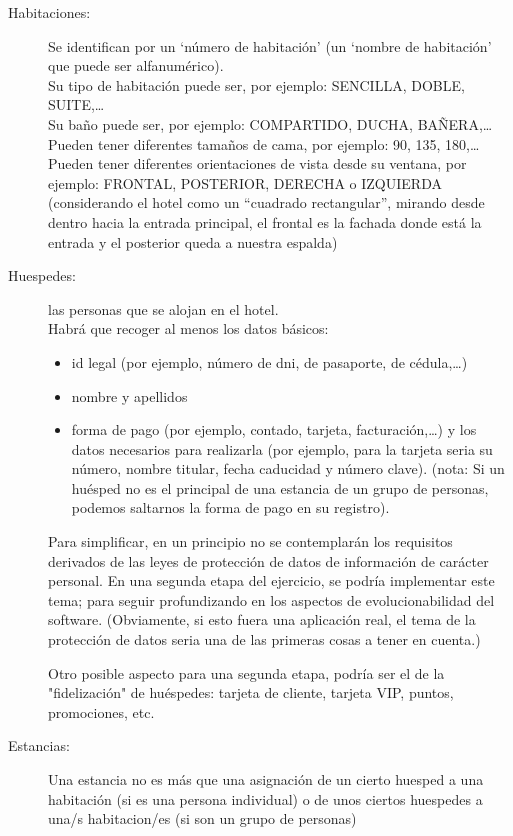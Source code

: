\documentclass[spanish,12pt,a4paper,final,oneside]{book}
\begin{document}
\begin{description}


\item[Habitaciones:] Se identifican por un `número de habitación' (un `nombre de habitación' que puede ser alfanumérico).
\\Su tipo de habitación puede ser, por ejemplo: SENCILLA, DOBLE, SUITE,\ldots
\\Su baño puede ser, por ejemplo:  COMPARTIDO, DUCHA, BAÑERA,\ldots
\\Pueden tener diferentes tamaños de cama, por ejemplo: 90, 135, 180,\ldots
\\Pueden tener diferentes orientaciones de vista desde su ventana, por ejemplo: FRONTAL, POSTERIOR, DERECHA o IZQUIERDA (considerando el hotel como un ``cuadrado rectangular'', mirando desde dentro hacia la entrada principal, el frontal es la fachada donde está la entrada y el posterior queda a nuestra espalda)

\item[Huespedes:] las personas que se alojan en el hotel.
\\Habrá que recoger al menos los datos básicos:
\begin{itemize}
\item id legal (por ejemplo, número de dni, de pasaporte, de cédula,\ldots)
\item nombre y apellidos
\item forma de pago (por ejemplo, contado, tarjeta, facturación,\ldots) y los datos necesarios para realizarla (por ejemplo, para la tarjeta seria su número, nombre titular, fecha caducidad y número clave).  (nota: Si un huésped no es el principal de una estancia de un grupo de personas, podemos saltarnos la forma de pago en su registro).
\end{itemize}

Para simplificar, en un principio no se contemplarán los requisitos derivados de las leyes de protección de datos de información de carácter personal.  En una segunda etapa del ejercicio, se podría implementar este tema; para seguir profundizando en los aspectos de evolucionabilidad del software.
(Obviamente, si esto fuera una aplicación real, el tema de la protección de datos seria una de las primeras cosas a tener en cuenta.)

Otro posible aspecto para una segunda etapa, podría ser el de la "fidelización" de huéspedes: tarjeta de cliente, tarjeta VIP, puntos, promociones, etc.

\item[Estancias:] Una estancia no es más que una asignación de un cierto huesped a una habitación (si es una persona individual) o de 
unos ciertos huespedes a una/s habitacion/es (si son un grupo de personas)


\end{description}
\end{document}
